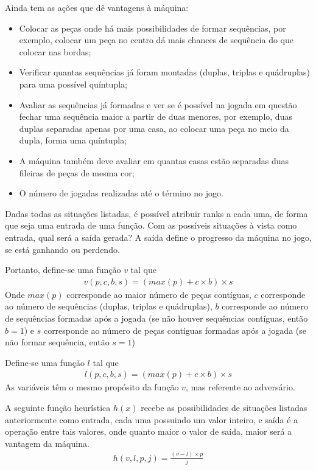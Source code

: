 \documentclass{article}
\begin{document}
    Ainda tem as ações que dê vantagens à máquina:
    \begin{itemize}
        \item Colocar as peças onde há mais possibilidades de formar
            sequências, por exemplo, colocar um peça no centro dá mais chances
            de sequência do que colocar nas bordas;
        \item Verificar quantas sequências já foram montadas (duplas, triplas e
            quádruplas) para uma possível quíntupla;
        \item Avaliar as sequências já formadas e ver se é possível na jogada
            em questão fechar uma sequência maior a partir de duas menores, por
            exemplo, duas duplas separadas apenas por uma casa, ao colocar uma
            peça no meio da dupla, forma uma quíntupla;
        \item A máquina também deve avaliar em quantas casas estão separadas
            duas fileiras de peças de mesma cor;
        \item O número de jogadas realizadas até o término no jogo.
    \end{itemize}
    
    Dadas todas as situações listadas, é possível atribuir ranks a cada uma, de
    forma que seja uma entrada de uma função. Com as possíveis situações à
    vista como entrada, qual será a saída gerada? A saída define o progresso da
    máquina no jogo, se está ganhando ou perdendo.
    
    Portanto, define-se uma função $v$ tal que
    \begin{gather*}
        v(p, c, b, s) = (max(p) + c \times b) \times s
    \end{gather*}
    Onde $max(p)$ corresponde ao maior número de peças contíguas, $c$
    corresponde ao número de sequências (duplas, triplas e quádruplas), $b$
    corresponde ao número de sequências formadas após a jogada (se não houver
    sequências contíguas, então $b = 1$) e $s$ corresponde ao número de peças
    contíguas formadas após a jogada (se não formar sequência, então $s = 1$)
    
    Define-se uma função $l$ tal que
    \begin{gather*}
        l(p, c, b, s) = (max(p) + c \times b) \times s
    \end{gather*}
    As variáveis têm o mesmo propósito da função $v$, mas referente ao
    adversário.
    
    A seguinte função heurística $h(x)$ recebe as possibilidades de situações
    listadas anteriormente como entrada, cada uma possuindo um valor inteiro, e
    saída é a operação entre tais valores, onde quanto maior o valor de saída,
    maior será a vantagem da máquina.
    \begin{gather*}
        h(v, l, p, j) = \frac{(v - l) \times p}{j}
    \end{gather*}
    
\end{document}
